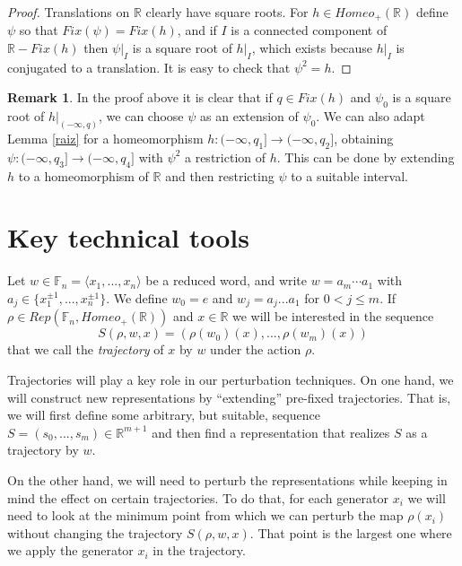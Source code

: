 \documentclass[12pt]{article}
\newcommand{\F}{\mathbb{F}}
\newcommand{\R}{\mathbb{R}}
\theoremstyle{definition}
\newtheorem{rem}[thm]{Remark}
\begin{document}
\begin{proof} Translations on $\R$ clearly have square roots. For $h\in Homeo_{+}(\R)$ define $\psi$ so that $Fix(\psi)=Fix(h)$, and if $I$ is a connected component of $\R-Fix(h)$ then $\psi|_{I}$ is a square root of $h|_{I}$, which exists because $h|_{I}$ is conjugated to a translation. It is easy to check that $\psi^2=h$. \end{proof}

\begin{rem} \label{mas raiz} In the proof above it is clear that if $q\in Fix(h)$ and $\psi_0$ is a square root of $h|_{(-\infty,q)}$, we can choose $\psi$ as an extension of $\psi_0$. We can also adapt Lemma \ref{raiz} for a homeomorphism $h:(-\infty,q_1]\to(-\infty,q_2]$, obtaining $\psi:(-\infty,q_3]\to(-\infty,q_4]$ with $\psi^2$ a restriction of $h$. This can be done by extending $h$ to a homeomorphism of $\R$ and then restricting $\psi$ to a suitable interval. %
\end{rem}


\section{Key technical tools}\label{troncocomun}


Let $w\in\F_n=\langle x_1,...,x_n\rangle$ be a reduced word, and write $w=a_m \cdots a_1$ with $a_j\in\{x_1^{\pm 1},...,x_n^{\pm 1}\}$. We define $w_0=e$ and $w_j=a_{j}...a_{1}$ for $0<j\leq m$.
If $\rho\in Rep(\F_n,Homeo_{+}(\R))$ and $x\in\R$ we will be interested in the sequence $$S(\rho,w,x)=(\rho(w_0)(x),...,\rho(w_m)(x))$$ that we call the {\em trajectory} of $x$ by $w$ under the action $\rho$. 

Trajectories will play a key role in our perturbation techniques. On one hand, we will construct new representations by ``extending'' pre-fixed trajectories. That is, we will first define some arbitrary, but suitable, sequence $S=(s_0,...,s_m)\in\R^{m+1}$ and then find a representation that realizes $S$ as a trajectory by $w$. 

On the other hand, we will need to perturb the representations while keeping in mind the effect on certain trajectories. To do that, for each generator $x_i$ we will need to look at the minimum point from which we can perturb the map $\rho(x_i)$ without changing the trajectory $S(\rho,w,x)$. That point is the largest one where we apply the generator $x_i$ in the trajectory. 
\end{document}
